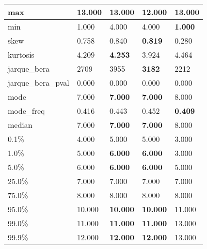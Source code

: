 \begin{table}[H]
\begin{tabular}{|l|m{10em}|m{10em}|m{10em}|m{10em}|}
\hline max & 13.000 & \bfseries 13.000 & \cellcolor[rgb]{0.9, 0.54, 0.52} 12.000 & \bfseries 13.000 \\
\hline min & 1.000 & \cellcolor[rgb]{0.9, 0.54, 0.52} 4.000 & \cellcolor[rgb]{0.9, 0.54, 0.52} 4.000 & \bfseries 1.000 \\
\hline skew & 0.758 & 0.840 & \bfseries 0.819 & \cellcolor[rgb]{0.9, 0.54, 0.52} 0.280 \\
\hline kurtosis & 4.209 & \bfseries 4.253 & \cellcolor[rgb]{0.9, 0.54, 0.52} 3.924 & 4.464 \\
\hline jarque\_bera & 2709 & \cellcolor[rgb]{0.9, 0.54, 0.52} 3955 & \bfseries 3182 & 2212 \\
\hline jarque\_bera\_pval & 0.000 & 0.000 & 0.000 & 0.000 \\
\hline mode & 7.000 & \bfseries 7.000 & \bfseries 7.000 & \cellcolor[rgb]{0.9, 0.54, 0.52} 8.000 \\
\hline mode\_freq & 0.416 & 0.443 & \cellcolor[rgb]{0.9, 0.54, 0.52} 0.452 & \bfseries 0.409 \\
\hline median & 7.000 & \bfseries 7.000 & \bfseries 7.000 & \cellcolor[rgb]{0.9, 0.54, 0.52} 8.000 \\
\hline 0.1\% & 4.000 & 5.000 & 5.000 & 3.000 \\
\hline 1.0\% & 5.000 & \bfseries 6.000 & \bfseries 6.000 & \cellcolor[rgb]{0.9, 0.54, 0.52} 3.000 \\
\hline 5.0\% & 6.000 & \bfseries 6.000 & \bfseries 6.000 & \cellcolor[rgb]{0.9, 0.54, 0.52} 5.000 \\
\hline 25.0\% & 7.000 & 7.000 & 7.000 & 7.000 \\
\hline 75.0\% & 8.000 & 8.000 & 8.000 & 8.000 \\
\hline 95.0\% & 10.000 & \bfseries 10.000 & \bfseries 10.000 & \cellcolor[rgb]{0.9, 0.54, 0.52} 11.000 \\
\hline 99.0\% & 11.000 & \bfseries 11.000 & \bfseries 11.000 & \cellcolor[rgb]{0.9, 0.54, 0.52} 13.000 \\
\hline 99.9\% & 12.000 & \bfseries 12.000 & \bfseries 12.000 & \cellcolor[rgb]{0.9, 0.54, 0.52} 13.000 \\
\hline
\end{tabular}
\end{table}
